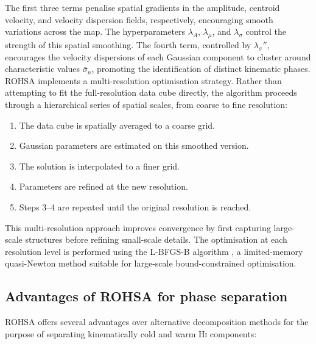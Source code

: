 \noindent The first three terms penalise spatial gradients in the amplitude, centroid velocity, and velocity dispersion fields, respectively, encouraging smooth variations across the map. The hyperparameters $\lambda_A$, $\lambda_\mu$, and $\lambda_\sigma$ control the strength of this spatial smoothing. The fourth term, controlled by $\lambda_\sigma''$, encourages the velocity dispersions of each Gaussian component to cluster around characteristic values $\bar{\sigma}_n$, promoting the identification of distinct kinematic phases.\\\indent
ROHSA implements a multi-resolution optimisation strategy. Rather than attempting to fit the full-resolution data cube directly, the algorithm proceeds through a hierarchical series of spatial scales, from coarse to fine resolution:

\begin{enumerate}
	\item The data cube is spatially averaged to a coarse grid.
	\item Gaussian parameters are estimated on this smoothed version.
	\item The solution is interpolated to a finer grid.
	\item Parameters are refined at the new resolution.
	\item Steps 3--4 are repeated until the original resolution is reached.
\end{enumerate}

\noindent This multi-resolution approach improves convergence by first capturing large-scale structures before refining small-scale details. The optimisation at each resolution level is performed using the L-BFGS-B algorithm \citep{Byrd1995}, a limited-memory quasi-Newton method suitable for large-scale bound-constrained optimisation.

\subsection{Advantages of ROHSA for phase separation}

ROHSA offers several advantages over alternative decomposition methods for the purpose of separating kinematically cold and warm \textrm{H\textsc{i}} components:

